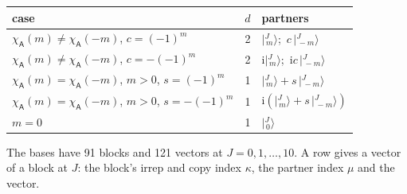 \documentclass[10pt,a4paper]{article}
\numberwithin{equation}{section}
\newcommand{\grp}[1]{\mathsf{#1}}
\newcommand{\iunit}{\mathrm{i}}
\newcommand{\chiA}{\chi_{\grp{A}}}
\newcommand{\mult}{\kappa}
\newcommand{\intx}{\mu}
\newcommand{\jm}[2]{\bigl\lvert{}^{#1}_{\,#2}\bigr\rangle}
\begin{document}
\begin{center}\begin{tabular}{@{}lrl@{}}\toprule
case & $d$ & partners\\\midrule
$\chiA(m) \ne \chiA(-m)$, $c = (-1)^m$ & 2 & $\jm{J}{m}$;\ $c\,\jm{J}{-m}$\\
$\chiA(m) \ne \chiA(-m)$, $c = -(-1)^m$ & 2 & $\iunit\jm{J}{m}$;\ $\iunit c\,\jm{J}{-m}$\\
$\chiA(m) = \chiA(-m)$, $m > 0$, $s = (-1)^m$ & 1 & $\jm{J}{m} + s\,\jm{J}{-m}$\\
$\chiA(m) = \chiA(-m)$, $m > 0$, $s = -(-1)^m$ & 1 & $\iunit(\jm{J}{m} + s\,\jm{J}{-m})$\\
$m = 0$ & 1 & $\jm{J}{0}$\\
\bottomrule\end{tabular}\end{center}
The bases have 91 blocks and 121 vectors at $J = 0, 1, \dots, 10$. \label{n:head.vector}A row gives a vector of a block at $J$: the block's irrep and copy index $\mult$, the partner index $\intx$ and the vector.
\end{document}
